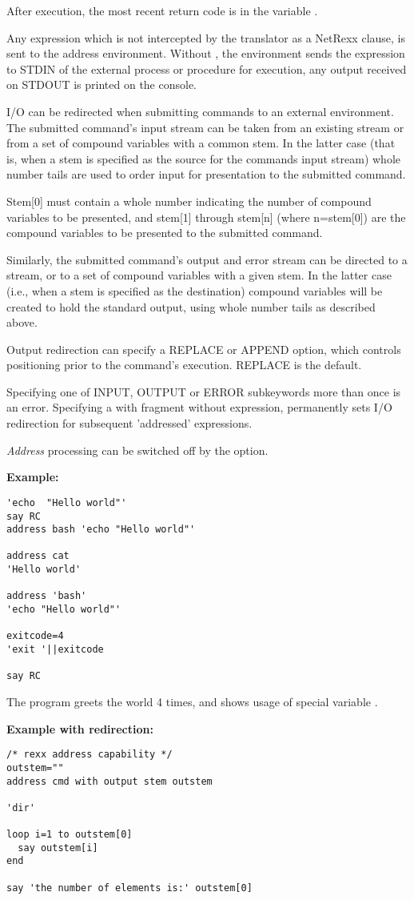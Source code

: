 After execution, the most recent return code is in the variable .

Any expression which is not intercepted by the translator as a NetRexx clause, is sent to the address environment.
Without , the environment sends the expression to STDIN of the external process or procedure for execution, 
any output received on STDOUT is printed on the console.

I/O can be redirected when submitting commands to an external
environment. The submitted command's input stream can be taken from an
existing stream or from a set of compound variables with a common
stem. In the latter case (that is, when a stem is specified as the
source for the commands input stream) whole number tails are used to
order input for presentation to the submitted command.

Stem[0] must contain a whole number indicating the number of compound variables to be presented, 
and stem[1] through stem[n] (where n=stem[0]) are the compound variables to be presented to the submitted command.

Similarly, the submitted command's output and error stream can be directed to a stream, 
or to a set of compound variables with a given stem. In the latter case (i.e., when a stem is specified as the destination) 
compound variables will be created to hold the standard output, using whole number tails as described above. 

Output redirection can specify a REPLACE or APPEND option, which controls positioning prior to the command's execution. REPLACE is the default.

Specifying one of INPUT, OUTPUT or ERROR subkeywords more than once is an error.
Specifying a with fragment without expression, permanently sets I/O redirection for subsequent 'addressed' expressions.

\emph{Address} processing can be switched off by the  option.

\textbf{Example:}
\begin{lstlisting}
'echo  "Hello world"'
say RC
address bash 'echo "Hello world"'

address cat
'Hello world'

address 'bash'
'echo "Hello world"'

exitcode=4
'exit '||exitcode
 
say RC
\end{lstlisting}
The program greets the world 4 times, and shows usage of special variable .

\textbf{Example with redirection:}
\begin{lstlisting}
/* rexx address capability */
outstem=""
address cmd with output stem outstem

'dir'

loop i=1 to outstem[0]
  say outstem[i]
end

say 'the number of elements is:' outstem[0]
\end{lstlisting}

